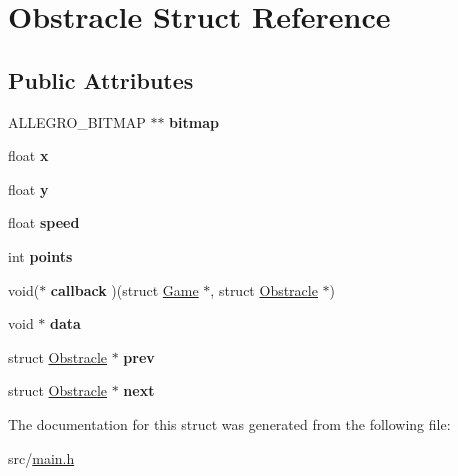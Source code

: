\hypertarget{structObstracle}{\section{\-Obstracle \-Struct \-Reference}
\label{structObstracle}
}
\subsection*{\-Public \-Attributes}
\begin{DoxyCompactItemize}
\item 
\hypertarget{structObstracle_acf122606753c2f07480db806df8b93d5}{\-A\-L\-L\-E\-G\-R\-O\-\_\-\-B\-I\-T\-M\-A\-P $\ast$$\ast$ {\bfseries bitmap}}\label{structObstracle_acf122606753c2f07480db806df8b93d5}

\item 
\hypertarget{structObstracle_ac5867732615109fff3853fef8d92e80d}{float {\bfseries x}}\label{structObstracle_ac5867732615109fff3853fef8d92e80d}

\item 
\hypertarget{structObstracle_a6ae46ede239e472694e85fd676cfcd57}{float {\bfseries y}}\label{structObstracle_a6ae46ede239e472694e85fd676cfcd57}

\item 
\hypertarget{structObstracle_ac2caa1000b80250712881260b5dbab99}{float {\bfseries speed}}\label{structObstracle_ac2caa1000b80250712881260b5dbab99}

\item 
\hypertarget{structObstracle_a4932772ef9292e687c3c7368cd7d98d4}{int {\bfseries points}}\label{structObstracle_a4932772ef9292e687c3c7368cd7d98d4}

\item 
\hypertarget{structObstracle_ae3bffa1dcd01c82b0bc9def156589629}{void($\ast$ {\bfseries callback} )(struct \hyperlink{structGame}{\-Game} $\ast$, struct \hyperlink{structObstracle}{\-Obstracle} $\ast$)}\label{structObstracle_ae3bffa1dcd01c82b0bc9def156589629}

\item 
\hypertarget{structObstracle_ace6288d7b280e8464ed963ecf0e96259}{void $\ast$ {\bfseries data}}\label{structObstracle_ace6288d7b280e8464ed963ecf0e96259}

\item 
\hypertarget{structObstracle_a806bba53896fd1f67ac028bc11329d9e}{struct \hyperlink{structObstracle}{\-Obstracle} $\ast$ {\bfseries prev}}\label{structObstracle_a806bba53896fd1f67ac028bc11329d9e}

\item 
\hypertarget{structObstracle_a77a2abb2e97a2ac6d0537c7a3d838a1a}{struct \hyperlink{structObstracle}{\-Obstracle} $\ast$ {\bfseries next}}\label{structObstracle_a77a2abb2e97a2ac6d0537c7a3d838a1a}

\end{DoxyCompactItemize}


\-The documentation for this struct was generated from the following file\-:\begin{DoxyCompactItemize}
\item 
src/\hyperlink{main_8h}{main.\-h}\end{DoxyCompactItemize}
